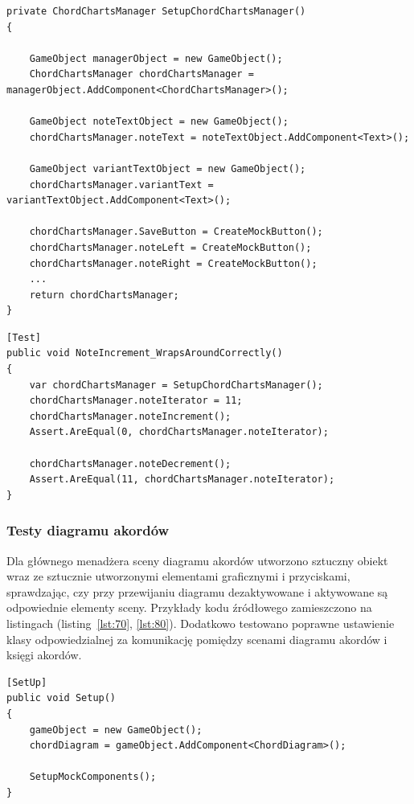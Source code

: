 \begin{lstlisting}[style=sharpcstyle,caption=Funkcja \texttt{SetupChordChartsManager}, label=lst:50]
private ChordChartsManager SetupChordChartsManager()
{

    GameObject managerObject = new GameObject();
    ChordChartsManager chordChartsManager = managerObject.AddComponent<ChordChartsManager>();

    GameObject noteTextObject = new GameObject();
    chordChartsManager.noteText = noteTextObject.AddComponent<Text>();

    GameObject variantTextObject = new GameObject();
    chordChartsManager.variantText = variantTextObject.AddComponent<Text>();

    chordChartsManager.SaveButton = CreateMockButton();
    chordChartsManager.noteLeft = CreateMockButton();
    chordChartsManager.noteRight = CreateMockButton();
    ...
    return chordChartsManager;
}
\end{lstlisting}


\begin{lstlisting}[style=sharpcstyle,caption=Funkcja \texttt{NoteIncrement\_WrapsAroundCorrectly}, label=lst:60]
[Test]
public void NoteIncrement_WrapsAroundCorrectly()
{
    var chordChartsManager = SetupChordChartsManager();
    chordChartsManager.noteIterator = 11;
    chordChartsManager.noteIncrement();
    Assert.AreEqual(0, chordChartsManager.noteIterator);

    chordChartsManager.noteDecrement();
    Assert.AreEqual(11, chordChartsManager.noteIterator);
}
\end{lstlisting}

\subsubsection{Testy diagramu akordów}

Dla głównego menadżera sceny diagramu akordów utworzono sztuczny obiekt wraz ze sztucznie utworzonymi elementami graficznymi i przyciskami, sprawdzając, czy przy przewijaniu diagramu dezaktywowane i aktywowane są odpowiednie elementy sceny. Przykłady kodu źródłowego zamieszczono na listingach (listing~\ref{lst:70}, \ref{lst:80}). Dodatkowo testowano poprawne ustawienie klasy odpowiedzialnej za komunikację pomiędzy scenami diagramu akordów i księgi akordów.

\begin{lstlisting}[style=sharpcstyle,caption=Funkcja \texttt{Setup}, label=lst:70]
[SetUp]
public void Setup()
{
    gameObject = new GameObject();
    chordDiagram = gameObject.AddComponent<ChordDiagram>();

    SetupMockComponents();
}
\end{lstlisting}

